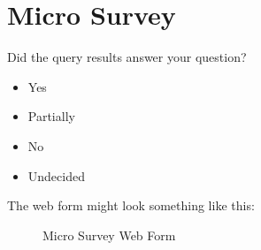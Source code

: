 \chapter{Micro Survey}
\label{cha:microsurvey-appendix}
Did the query results answer your question?

\begin{itemize}
\item Yes
\item Partially
\item No
\item Undecided
\end{itemize}

The web form might look something like this:
\begin{figure}[htbp]
  {\centerline {}}
  \caption{Micro Survey Web Form}
  \label{fig:microsurvey}
\end{figure}

\normalsize

\newpage
